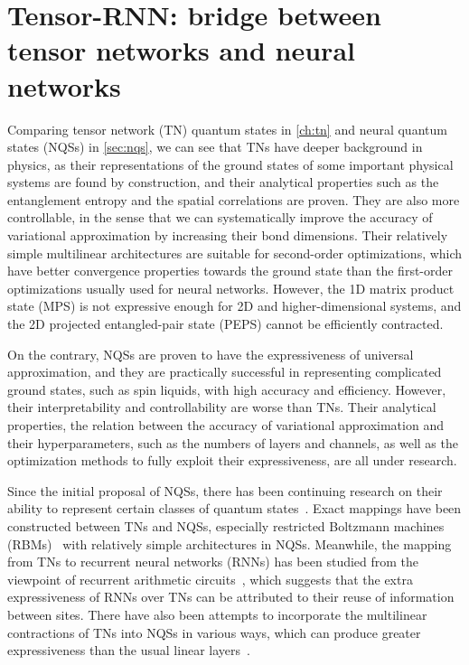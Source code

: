 \chapter{Tensor-RNN: bridge between tensor networks and neural networks}
\label{ch:tensor-rnn}

Comparing tensor network (TN) quantum states in \cref{ch:tn} and neural quantum states (NQSs) in \cref{sec:nqs}, we can see that TNs have deeper background in physics, as their representations of the ground states of some important physical systems are found by construction, and their analytical properties such as the entanglement entropy and the spatial correlations are proven. They are also more controllable, in the sense that we can systematically improve the accuracy of variational approximation by increasing their bond dimensions. Their relatively simple multilinear architectures are suitable for second-order optimizations, which have better convergence properties towards the ground state than the first-order optimizations usually used for neural networks. However, the 1D matrix product state (MPS) is not expressive enough for 2D and higher-dimensional systems, and the 2D projected entangled-pair state (PEPS) cannot be efficiently contracted.

On the contrary, NQSs are proven to have the expressiveness of universal approximation, and they are practically successful in representing complicated ground states, such as spin liquids, with high accuracy and efficiency. However, their interpretability and controllability are worse than TNs. Their analytical properties, the relation between the accuracy of variational approximation and their hyperparameters, such as the numbers of layers and channels, as well as the optimization methods to fully exploit their expressiveness, are all under research.

Since the initial proposal of NQSs, there has been continuing research on their ability to represent certain classes of quantum states~\cite{gao2017efficient, carleo2018constructing, sharir2022neural}. Exact mappings have been constructed between TNs and NQSs, especially restricted Boltzmann machines (RBMs)~\cite{glasser2018neural, chen2018equivalence} with relatively simple architectures in NQSs. Meanwhile, the mapping from TNs to recurrent neural networks (RNNs) has been studied from the viewpoint of recurrent arithmetic circuits~\cite{levine2017long, levine2019quantum}, which suggests that the extra expressiveness of RNNs over TNs can be attributed to their reuse of information between sites. There have also been attempts to incorporate the multilinear contractions of TNs into NQSs in various ways, which can produce greater expressiveness than the usual linear layers~\cite{hibat2021variational, hibat2022supplementing, chen2023antn}.

